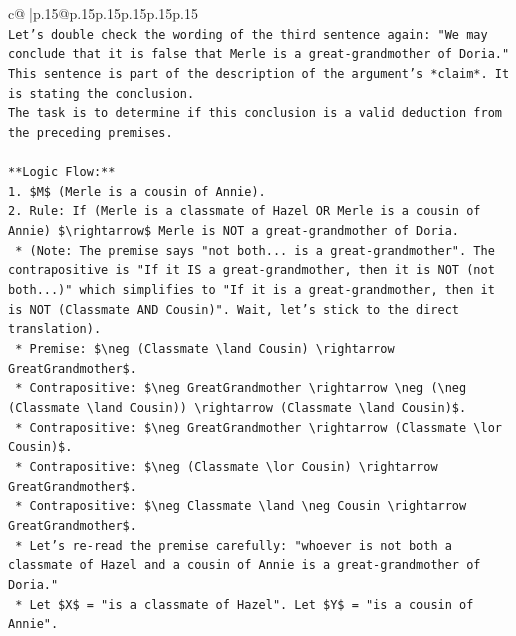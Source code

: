 \documentclass{article}
\begin{document}
{\begin{supertabular}{c@{$\;$}|p{.15\linewidth}@{}p{.15\linewidth}p{.15\linewidth}p{.15\linewidth}p{.15\linewidth}p{.15\linewidth}}
{{{\\ 
\texttt{Let's double check the wording of the third sentence again: "We may conclude that it is false that Merle is a great{-}grandmother of Doria."} \\
\texttt{This sentence is part of the description of the argument's *claim*. It is stating the conclusion.} \\
\texttt{The task is to determine if this conclusion is a valid deduction from the preceding premises.} \\
\\ 
\texttt{**Logic Flow:**} \\
\texttt{1.  \$M\$ (Merle is a cousin of Annie).} \\
\texttt{2.  Rule: If (Merle is a classmate of Hazel OR Merle is a cousin of Annie) \$\textbackslash{}rightarrow\$ Merle is NOT a great{-}grandmother of Doria.} \\
\texttt{    *   (Note: The premise says "not both... is a great{-}grandmother". The contrapositive is "If it IS a great{-}grandmother, then it is NOT (not both...)" which simplifies to "If it is a great{-}grandmother, then it is NOT (Classmate AND Cousin)". Wait, let's stick to the direct translation).} \\
\texttt{    *   Premise: \$\textbackslash{}neg (Classmate \textbackslash{}land Cousin) \textbackslash{}rightarrow GreatGrandmother\$.} \\
\texttt{    *   Contrapositive: \$\textbackslash{}neg GreatGrandmother \textbackslash{}rightarrow \textbackslash{}neg (\textbackslash{}neg (Classmate \textbackslash{}land Cousin)) \textbackslash{}rightarrow (Classmate \textbackslash{}land Cousin)\$.} \\
\texttt{    *   Contrapositive: \$\textbackslash{}neg GreatGrandmother \textbackslash{}rightarrow (Classmate \textbackslash{}lor Cousin)\$.} \\
\texttt{    *   Contrapositive: \$\textbackslash{}neg (Classmate \textbackslash{}lor Cousin) \textbackslash{}rightarrow GreatGrandmother\$.} \\
\texttt{    *   Contrapositive: \$\textbackslash{}neg Classmate \textbackslash{}land \textbackslash{}neg Cousin \textbackslash{}rightarrow GreatGrandmother\$.} \\
\texttt{    *   Let's re{-}read the premise carefully: "whoever is not both a classmate of Hazel and a cousin of Annie is a great{-}grandmother of Doria."} \\
\texttt{    *   Let \$X\$ = "is a classmate of Hazel". Let \$Y\$ = "is a cousin of Annie".} \\
}}}
\end{supertabular}}
\end{document}
